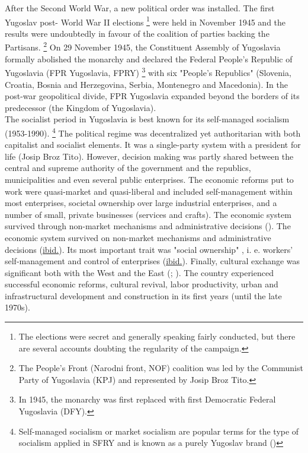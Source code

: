 \documentclass[11pt]{report}
\begin{document}
{{{{After the Second World War, a new political order was installed. The first Yugoslav post- World War II elections
\footnote{The elections were secret and generally speaking fairly conducted, but there are several accounts doubting the regularity of the campaign.}
were held in November 1945 and the results were undoubtedly in favour of the coalition of parties backing the Partisans.
\footnote{The People’s Front (Narodni front, NOF) coalition was led by the Communist Party of Yugoslavia (KPJ) and
represented by Josip Broz Tito.}
On 29 November 1945, the Constituent Assembly of Yugoslavia formally abolished the monarchy and declared the Federal People's Republic of Yugoslavia (FPR Yugoslavia, FPRY)
\footnote{In 1945, the monarchy was first replaced with  first Democratic Federal Yugoslavia (DFY).}
with six "People's Republics" (Slovenia, Croatia, Bosnia and Herzegovina, Serbia, Montenegro and Macedonia).
In the post-war geopolitical divide, FPR Yugoslavia expanded beyond the borders of its predecessor (the Kingdom of Yugoslavia).
\\

The socialist period in Yugoslavia is best known for its self-managed socialism (1953-1990).
\footnote{Self-managed socialism or market socialism are popular terms for the type of socialism applied in SFRY and is known as a purely Yugoslav brand (\href{Estrin}{\citealt{estrin_yugoslavia:_1991}})}
The political regime was decentralized yet authoritarian with both capitalist and socialist elements. It was a single-party system with a president for life (Josip Broz Tito). However, decision making was partly shared between the central and supreme authority of the government and the republics, municipalities and even several public enterprises. The economic reforms put to work were quasi-market and quasi-liberal and included self-management within most  enterprises, societal ownership over large industrial enterprises, and a number of small, private businesses (services and crafts). The economic system survived through non-market mechanisms and administrative decisions (\href{Estrin}{\citealt{estrin_yugoslavia:_1991}}).
The economic system survived on non-market mechanisms and administrative decisions (\href{ref}{ibid.}).
Its most important trait was "social  ownership" , i. e.  workers' self-management and control of  enterprises (\href{ref}{ibid.}).
Finally, cultural exchange was significant both with the West and the East  (\href{Hirt}{\citealt{hirt_belgrade_2009}}; \href{Vujosevic}{\citealt{vujosevic_conundrum_2012}}).
The country experienced successful economic reforms, cultural revival, labor productivity, urban and infrastructural development and construction in its first years (until the late 1970s).
\\

}}}}
\end{document}
